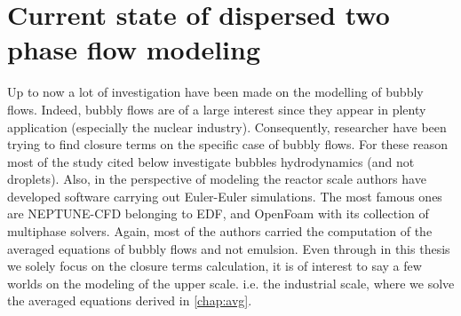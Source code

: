 \section{Current state of dispersed two phase flow  modeling}

Up to now a lot of investigation have been made on the modelling of bubbly flows.
Indeed, bubbly flows are of a large interest since they appear in plenty application (especially the nuclear industry).
Consequently, researcher have been trying to find closure terms on the specific case of bubbly flows. 
For these reason most of the study cited below investigate bubbles hydrodynamics (and not droplets). 
Also, in the perspective of modeling the reactor scale authors have developed software carrying out Euler-Euler simulations. 
The most famous ones are NEPTUNE-CFD belonging to EDF, and OpenFoam with its collection of multiphase solvers. 
Again, most of the authors carried the computation of the averaged equations of bubbly flows and not emulsion.
Even through in this thesis we solely focus on the closure terms calculation, it is of interest to say a few worlds on the modeling of the upper scale.
i.e. the industrial scale, where we solve the averaged equations derived in \ref{chap:avg}. 

